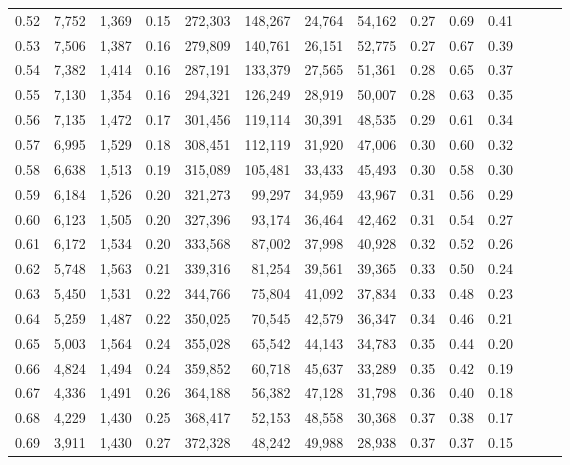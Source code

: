 \begin{tabular}{rrrrrrrrrrrrrr}
0.52 &   7,752 &  1,369 &  0.15 &  272,303 &  148,267 &  24,764 &  54,162 &  0.27 &  0.69 &      0.41 \\
0.53 &   7,506 &  1,387 &  0.16 &  279,809 &  140,761 &  26,151 &  52,775 &  0.27 &  0.67 &      0.39 \\
0.54 &   7,382 &  1,414 &  0.16 &  287,191 &  133,379 &  27,565 &  51,361 &  0.28 &  0.65 &      0.37 \\
0.55 &   7,130 &  1,354 &  0.16 &  294,321 &  126,249 &  28,919 &  50,007 &  0.28 &  0.63 &      0.35 \\
0.56 &   7,135 &  1,472 &  0.17 &  301,456 &  119,114 &  30,391 &  48,535 &  0.29 &  0.61 &      0.34 \\
0.57 &   6,995 &  1,529 &  0.18 &  308,451 &  112,119 &  31,920 &  47,006 &  0.30 &  0.60 &      0.32 \\
0.58 &   6,638 &  1,513 &  0.19 &  315,089 &  105,481 &  33,433 &  45,493 &  0.30 &  0.58 &      0.30 \\
0.59 &   6,184 &  1,526 &  0.20 &  321,273 &   99,297 &  34,959 &  43,967 &  0.31 &  0.56 &      0.29 \\
0.60 &   6,123 &  1,505 &  0.20 &  327,396 &   93,174 &  36,464 &  42,462 &  0.31 &  0.54 &      0.27 \\
0.61 &   6,172 &  1,534 &  0.20 &  333,568 &   87,002 &  37,998 &  40,928 &  0.32 &  0.52 &      0.26 \\
0.62 &   5,748 &  1,563 &  0.21 &  339,316 &   81,254 &  39,561 &  39,365 &  0.33 &  0.50 &      0.24 \\
0.63 &   5,450 &  1,531 &  0.22 &  344,766 &   75,804 &  41,092 &  37,834 &  0.33 &  0.48 &      0.23 \\
0.64 &   5,259 &  1,487 &  0.22 &  350,025 &   70,545 &  42,579 &  36,347 &  0.34 &  0.46 &      0.21 \\
0.65 &   5,003 &  1,564 &  0.24 &  355,028 &   65,542 &  44,143 &  34,783 &  0.35 &  0.44 &      0.20 \\
0.66 &   4,824 &  1,494 &  0.24 &  359,852 &   60,718 &  45,637 &  33,289 &  0.35 &  0.42 &      0.19 \\
0.67 &   4,336 &  1,491 &  0.26 &  364,188 &   56,382 &  47,128 &  31,798 &  0.36 &  0.40 &      0.18 \\
0.68 &   4,229 &  1,430 &  0.25 &  368,417 &   52,153 &  48,558 &  30,368 &  0.37 &  0.38 &      0.17 \\
0.69 &   3,911 &  1,430 &  0.27 &  372,328 &   48,242 &  49,988 &  28,938 &  0.37 &  0.37 &      0.15 \\

\end{tabular}
